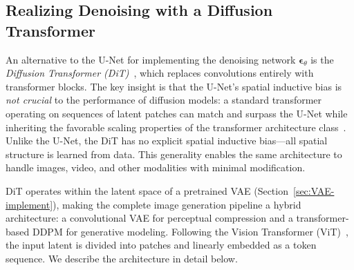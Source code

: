 \documentclass[../../book-main.tex]{subfiles}
\begin{document}


\subsection{Realizing Denoising with a Diffusion Transformer}
\label{sec:DiT-implement}

An alternative to the U-Net for implementing the denoising network
$\boldsymbol{\epsilon}_\theta$ is the \textit{Diffusion Transformer
(DiT)}~\citep{peebles2023scalable}, which replaces convolutions
entirely with transformer blocks. The key insight is that the U-Net's
spatial inductive bias is \emph{not crucial} to the performance of
diffusion models: a standard transformer operating on sequences of
latent patches can match and surpass the U-Net while inheriting the
favorable scaling properties of the transformer architecture
class~\citep{vaswani2017attention}. Unlike the U-Net, the DiT has no
explicit spatial inductive bias---all spatial structure is learned
from data. This generality enables the same architecture to handle
images, video, and other modalities with minimal modification.

DiT operates within the latent space of a pretrained VAE
(Section~\ref{sec:VAE-implement}), making the complete image
generation pipeline a hybrid architecture: a convolutional VAE for
perceptual compression and a transformer-based DDPM for generative
modeling. Following the Vision Transformer
(ViT)~\citep{dosovitskiy2020image}, the input latent is divided into
patches and linearly embedded as a token sequence. We describe the
architecture in detail below.
\end{document}
